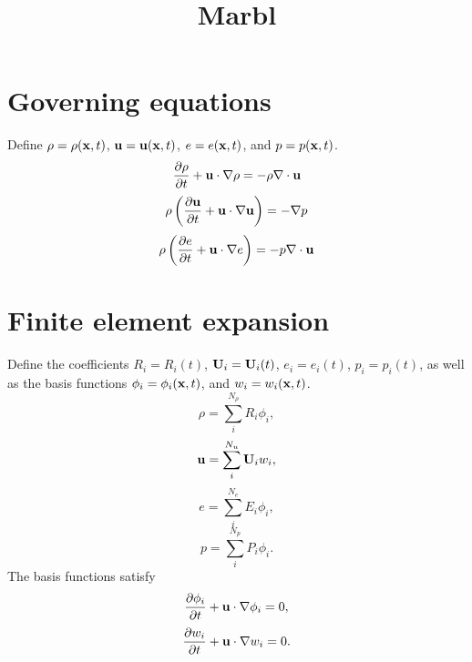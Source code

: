 \documentclass[11pt]{article}
\title{Marbl}
\begin{document}
\maketitle

\section{Governing equations}
Define $\rho = \rho(\mathbf{x},t)$, $\mathbf{u} = \mathbf{u}(\mathbf{x},t)$, $e = e(\mathbf{x},t)$, and $p = p(\mathbf{x},t)$.
\begin{equation}
    \frac{\partial \rho}{\partial t} + \mathbf{u} \cdot \nabla \rho = -\rho \nabla \cdot \mathbf{u}
\end{equation}
\begin{equation}
    \rho \left ( \frac{\partial \mathbf{u}}{\partial t} + \mathbf{u} \cdot \nabla \mathbf{u} \right ) = -\nabla p
\end{equation}
\begin{equation}
    \rho \left ( \frac{\partial e}{\partial t} + \mathbf{u} \cdot \nabla e \right ) = -p \nabla \cdot \mathbf{u}
\end{equation}

\section{Finite element expansion}
Define the coefficients $R_i = R_i(t)$, $\mathbf{U}_i = \mathbf{U}_i(t)$, $e_i = e_i(t)$, $p_i = p_i(t)$, as well as the basis functions $\phi_i = \phi_i(\mathbf{x},t)$, and $w_i = w_i(\mathbf{x},t)$.
\begin{equation}
    \rho = \sum_i^{N_\rho} R_i \phi_i,
\end{equation}
\begin{equation}
    \mathbf{u} = \sum_i^{N_u} \mathbf{U}_i w_i,
\end{equation}
\begin{equation}
    e = \sum_i^{N_e} E_i \phi_i,
\end{equation}
\begin{equation}
    p = \sum_i^{N_p} P_i \phi_i.
\end{equation}
The basis functions satisfy
\begin{equation}
    \frac{\partial \phi_i}{\partial t} + \mathbf{u} \cdot \nabla \phi_i = 0,
\end{equation}
\begin{equation}
    \frac{\partial w_i}{\partial t} + \mathbf{u} \cdot \nabla w_i = 0.
\end{equation}
\end{document}
